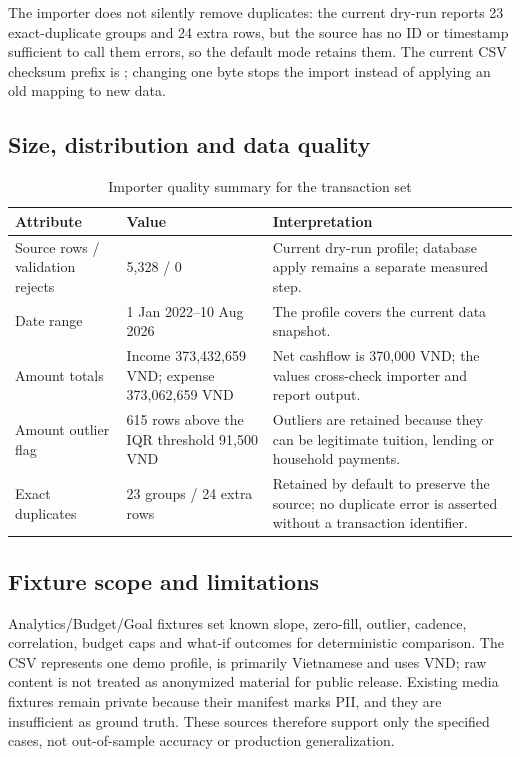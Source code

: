 The importer does not silently remove duplicates: the current dry-run reports 23 exact-duplicate groups and 24 extra rows, but the source has no ID or timestamp sufficient to call them errors, so the default mode retains them. The current CSV checksum prefix is ; changing one byte stops the import instead of applying an old mapping to new data.

\subsection{Size, distribution and data quality}

\begin{table}[H]
  \centering
  \caption{Importer quality summary for the transaction set}
  \label{tab:app-dataset-quality}
  \begin{tabularx}{\textwidth}{@{}L{5.0cm}R{2.8cm}Y@{}}
    \toprule
    \textbf{Attribute} & \textbf{Value} & \textbf{Interpretation} \\
    \midrule
    Source rows / validation rejects & 5,328 / 0 & Current dry-run profile; database apply remains a separate measured step. \\
    Date range & 1 Jan 2022--10 Aug 2026 & The profile covers the current data snapshot. \\
    Amount totals & Income 373,432,659 VND; expense 373,062,659 VND & Net cashflow is 370,000 VND; the values cross-check importer and report output. \\
    Amount outlier flag & 615 rows above the IQR threshold 91,500 VND & Outliers are retained because they can be legitimate tuition, lending or household payments. \\
    Exact duplicates & 23 groups / 24 extra rows & Retained by default to preserve the source; no duplicate error is asserted without a transaction identifier. \\
    \bottomrule
  \end{tabularx}
\end{table}

\subsection{Fixture scope and limitations}

Analytics/Budget/Goal fixtures set known slope, zero-fill, outlier, cadence, correlation, budget caps and what-if outcomes for deterministic comparison. The CSV represents one demo profile, is primarily Vietnamese and uses VND; raw content is not treated as anonymized material for public release. Existing media fixtures remain private because their manifest marks PII, and they are insufficient as ground truth. These sources therefore support only the specified cases, not out-of-sample accuracy or production generalization.

